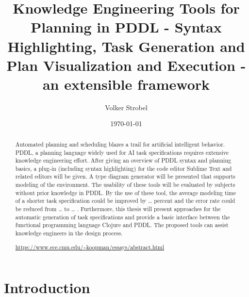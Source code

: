 \documentclass[11pt]{article}
\author{Volker Strobel}
\date{\today}
\title{Knowledge Engineering Tools for Planning in PDDL - Syntax Highlighting, Task Generation and Plan Visualization and Execution - an extensible framework}
\begin{document}
\maketitle
\tableofcontents

\begin{abstract}
Automated planning and scheduling blazes a trail for artificial
intelligent behavior. PDDL, a planning language widely used for AI
task specifications requires extensive knowledge engineering effort.
After giving an overview of PDDL syntax and planning basics, a plug-in
(including syntax highlighting) for the code editor Sublime Text and
related editors will be given. A type diagram generator will be
presented that supports modeling of the environment. The usability of
these tools will be evaluated by subjects without prior knowledge in
PDDL. By the use of these tool, the average modeling time of a shorter
task specification could be improved by \ldots{} percent and the error rate
could be reduced from \ldots{} to \ldots{} . Furthermore, this thesis will
present approaches for the automatic generation of task specifications
and provide a basic interface between the functional programming
language Clojure and PDDL. The proposed tools can assist knowledge
engineers in the design process.

\url{https://www.ece.cmu.edu/~koopman/essays/abstract.html}
\end{abstract}
\section{Introduction}
\label{sec-1}
\begin{center}
\end{center}
\end{document}

